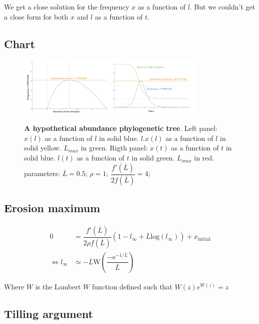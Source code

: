 \documentclass{article}
\begin{document}
We get a close solution for the frequency $x$ as a function of $l$. But we couldn't get a close form for both $x$ and $l$ as a function of $t$.


\subsection{Chart}
	\begin{figure}[H]
	  \centering
       \includegraphics[width=9.0cm]{Images/SingleAllele.png}\\
		\caption{ \textbf{A hypothetical abundance phylogenetic tree}. 
		\label{fig:singleallele}
		Left panel:  
$x(l)$ as a function of $l$ in solid blue.   
$l.x(l)$ as a function of $l$ in solid yellow.  
$L_{max}$ in green. 
Rigth panel:  
$x(t)$ as a function of $t$ in solid blue.   
$l(t)$ as a function of $t$ in solid green.  
$L_{max}$ in red. 
parameters: $\overline{L} = 0.5$; $\rho = 1$; $\dfrac{f'(\overline{L})}{2 f(\overline{L})} = 4$;}
	\end{figure}
\subsection{Erosion maximum}

\begin{equation}
  \begin{aligned}
    0 &=\dfrac{f'(\overline{L})}{2 \rho f(\overline{L})} (1-l_{\infty} + \overline{L} \mathrm{log}(l_{\infty})) + x_{\mathrm{initial}}\\
       \iff   l_{\infty} &\simeq - \overline{L} \mathrm{W} \left(\dfrac{ - \mathrm{e}^{- 1 / \overline{L}}}{\overline{L}}  \right)
  \end{aligned}
\end{equation}

Where $W$ is the Lambert $W$ function defined such that $W(z)e^{W(z)}=z$
\subsection{Tilling argument}
\end{document}
